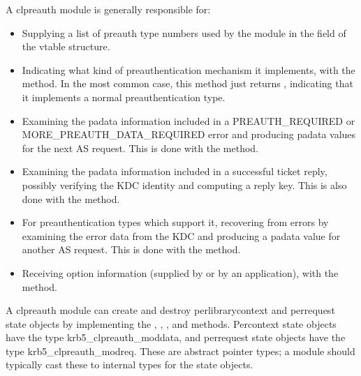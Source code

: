 \documentclass[letterpaper,10pt,english]{sphinxmanual}
\begin{document}
\sphinxAtStartPar
A clpreauth module is generally responsible for:
\begin{itemize}
\item {} 
\sphinxAtStartPar
Supplying a list of preauth type numbers used by the module in the
 field of the vtable structure.

\item {} 
\sphinxAtStartPar
Indicating what kind of preauthentication mechanism it implements,
with the  method.  In the most common case, this method
just returns , indicating that it implements a normal
preauthentication type.

\item {} 
\sphinxAtStartPar
Examining the padata information included in a PREAUTH\_REQUIRED or
MORE\_PREAUTH\_DATA\_REQUIRED error and producing padata values for the
next AS request.  This is done with the  method.

\item {} 
\sphinxAtStartPar
Examining the padata information included in a successful ticket
reply, possibly verifying the KDC identity and computing a reply
key.  This is also done with the  method.

\item {} 
\sphinxAtStartPar
For preauthentication types which support it, recovering from errors
by examining the error data from the KDC and producing a padata
value for another AS request.  This is done with the 
method.

\item {} 
\sphinxAtStartPar
Receiving option information (supplied by  or by an
application), with the  method.

\end{itemize}

\sphinxAtStartPar
A clpreauth module can create and destroy per\sphinxhyphen{}library\sphinxhyphen{}context and
per\sphinxhyphen{}request state objects by implementing the , ,
, and  methods.  Per\sphinxhyphen{}context state
objects have the type krb5\_clpreauth\_moddata, and per\sphinxhyphen{}request state
objects have the type krb5\_clpreauth\_modreq.  These are abstract
pointer types; a module should typically cast these to internal
types for the state objects.
\end{document}
